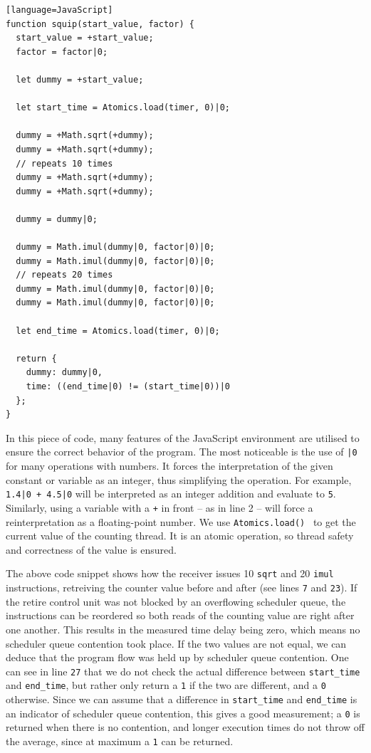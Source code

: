 \documentclass[11pt,
  titlepage=false,
]{scrreprt}
\begin{document}
\begin{lstlisting}[float][language=JavaScript]
function squip(start_value, factor) {
  start_value = +start_value;
  factor = factor|0;

  let dummy = +start_value;

  let start_time = Atomics.load(timer, 0)|0;

  dummy = +Math.sqrt(+dummy);
  dummy = +Math.sqrt(+dummy);
  // repeats 10 times
  dummy = +Math.sqrt(+dummy);
  dummy = +Math.sqrt(+dummy);

  dummy = dummy|0;

  dummy = Math.imul(dummy|0, factor|0)|0;
  dummy = Math.imul(dummy|0, factor|0)|0;
  // repeats 20 times
  dummy = Math.imul(dummy|0, factor|0)|0;
  dummy = Math.imul(dummy|0, factor|0)|0;

  let end_time = Atomics.load(timer, 0)|0;

  return {
    dummy: dummy|0,
    time: ((end_time|0) != (start_time|0))|0
  };
}
\end{lstlisting}

In this piece of code, many features of the JavaScript environment are utilised to ensure the correct behavior of the program.
The most noticeable is the use of \texttt{|0} for many operations with numbers.
It forces the interpretation of the given constant or variable as an integer, thus simplifying the operation.
For example, \texttt{1.4|0 + 4.5|0} will be interpreted as an integer addition and evaluate to \texttt{5}.
Similarly, using a variable with a \texttt{+} in front -- as in line 2 -- will force a reinterpretation as a floating-point number.
We use \texttt{Atomics.load()}~\cite{atomicsload} to get the current value of the counting thread.
It is an atomic operation, so thread safety and correctness of the value is ensured.

The above code snippet shows how the receiver issues 10 \texttt{sqrt} and 20 \texttt{imul} instructions,
retreiving the counter value before and after (see lines \texttt{7} and \texttt{23}).
If the retire control unit was not blocked by an overflowing scheduler queue,
the instructions can be reordered so both reads of the counting value are right after one another.
This results in the measured time delay being zero, which means no scheduler queue contention took place.
If the two values are not equal, we can deduce that the program flow was held up by scheduler queue contention.
One can see in line \texttt{27} that we do not check the actual difference between \texttt{start\_time} and \texttt{end\_time},
but rather only return a \texttt{1} if the two are different, and a \texttt{0} otherwise.
Since we can assume that a difference in \texttt{start\_time} and \texttt{end\_time} is an indicator of scheduler queue contention,
this gives a good measurement;
a \texttt{0} is returned when there is no contention, and longer execution times do not throw off the average,
since at maximum a \texttt{1} can be returned.
\end{document}
